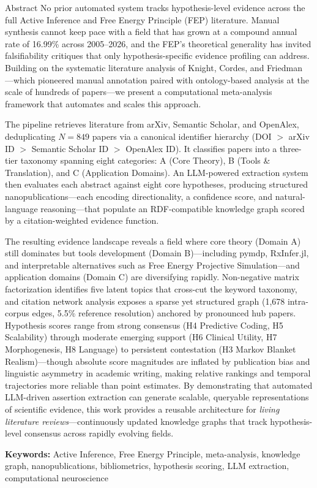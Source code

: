 \documentclass[
  ignorenonframetext,
]{beamer}
\author{\texorpdfstring{}{}}
\date{}
\begin{document}
\begin{frame}{Abstract}
\protect{}\label{abstract}
No prior automated system tracks hypothesis-level evidence across the
full Active Inference and Free Energy Principle (FEP) literature. Manual
synthesis cannot keep pace with a field that has grown at a compound
annual rate of 16.99\% across 2005--2026, and the FEP's theoretical
generality has invited falsifiability critiques \citep{colombo2021free}
that only hypothesis-specific evidence profiling can address. Building
on the systematic literature analysis of Knight, Cordes, and Friedman
\citep{knight2022fep}---which pioneered manual annotation paired with
ontology-based analysis at the scale of hundreds of papers---we present
a computational meta-analysis framework that automates and scales this
approach.

The pipeline retrieves literature from arXiv, Semantic Scholar, and
OpenAlex, deduplicating \(N = 849\) papers via a canonical identifier
hierarchy (DOI \(>\) arXiv ID \(>\) Semantic Scholar ID \(>\) OpenAlex
ID). It classifies papers into a three-tier taxonomy spanning eight
categories: A (Core Theory), B (Tools \& Translation), and C
(Application Domains). An LLM-powered extraction system then evaluates
each abstract against eight core hypotheses, producing structured
nanopublications---each encoding directionality, a confidence score, and
natural-language reasoning---that populate an RDF-compatible knowledge
graph scored by a citation-weighted evidence function.

The resulting evidence landscape reveals a field where core theory
(Domain A) still dominates but tools development (Domain B)---including
pymdp, RxInfer.jl, and interpretable alternatives such as Free Energy
Projective Simulation---and application domains (Domain C) are
diversifying rapidly. Non-negative matrix factorization identifies five
latent topics that cross-cut the keyword taxonomy, and citation network
analysis exposes a sparse yet structured graph (1,678 intra-corpus
edges, 5.5\% reference resolution) anchored by pronounced hub papers.
Hypothesis scores range from strong consensus (H4 Predictive Coding, H5
Scalability) through moderate emerging support (H6 Clinical Utility, H7
Morphogenesis, H8 Language) to persistent contestation (H3 Markov
Blanket Realism)---though absolute score magnitudes are inflated by
publication bias and linguistic asymmetry in academic writing, making
relative rankings and temporal trajectories more reliable than point
estimates. By demonstrating that automated LLM-driven assertion
extraction can generate scalable, queryable representations of
scientific evidence, this work provides a reusable architecture for
\emph{living literature reviews}---continuously updated knowledge graphs
that track hypothesis-level consensus across rapidly evolving fields.

\textbf{Keywords:} Active Inference, Free Energy Principle,
meta-analysis, knowledge graph, nanopublications, bibliometrics,
hypothesis scoring, LLM extraction, computational neuroscience
\end{frame}
\end{document}
